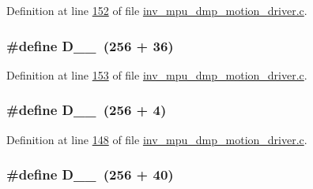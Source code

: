 Definition at line \hyperlink{inv__mpu__dmp__motion__driver_8c_source_l00152}{152} of file \hyperlink{inv__mpu__dmp__motion__driver_8c_source}{inv\+\_\+mpu\+\_\+dmp\+\_\+motion\+\_\+driver.\+c}.

\subsubsection[{\texorpdfstring{D\+\_\+1\+\_\+36}{D_1_36}}]{\setlength{\rightskip}{0pt plus 5cm}\#define D\+\_\+\_~(256 + 36)}\hypertarget{group___d_r_i_v_e_r_s_ga359aac18087bef8a3f044faf13952fa2}{}\label{group___d_r_i_v_e_r_s_ga359aac18087bef8a3f044faf13952fa2}


Definition at line \hyperlink{inv__mpu__dmp__motion__driver_8c_source_l00153}{153} of file \hyperlink{inv__mpu__dmp__motion__driver_8c_source}{inv\+\_\+mpu\+\_\+dmp\+\_\+motion\+\_\+driver.\+c}.

\subsubsection[{\texorpdfstring{D\+\_\+1\+\_\+4}{D_1_4}}]{\setlength{\rightskip}{0pt plus 5cm}\#define D\+\_\+\_~(256 + 4)}\hypertarget{group___d_r_i_v_e_r_s_ga83973bf9de6879524cca19f3332e707e}{}\label{group___d_r_i_v_e_r_s_ga83973bf9de6879524cca19f3332e707e}


Definition at line \hyperlink{inv__mpu__dmp__motion__driver_8c_source_l00148}{148} of file \hyperlink{inv__mpu__dmp__motion__driver_8c_source}{inv\+\_\+mpu\+\_\+dmp\+\_\+motion\+\_\+driver.\+c}.

\subsubsection[{\texorpdfstring{D\+\_\+1\+\_\+40}{D_1_40}}]{\setlength{\rightskip}{0pt plus 5cm}\#define D\+\_\+\_~(256 + 40)}\hypertarget{group___d_r_i_v_e_r_s_gae0dfa8b55558dff48604d4ac2c28fa9c}{}\label{group___d_r_i_v_e_r_s_gae0dfa8b55558dff48604d4ac2c28fa9c}


